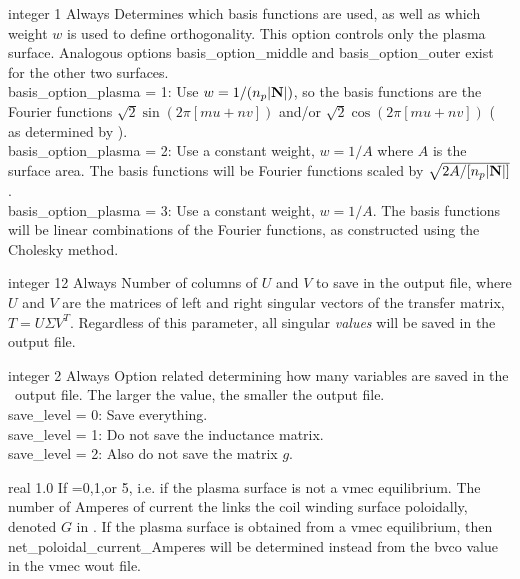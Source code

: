 {integer}
{1}
{Always}
{Determines which basis functions are used, as well as which weight $w$ is used to define orthogonality.
This option controls only the plasma surface. Analogous options {\ttfamily basis\_option\_middle} and {\ttfamily basis\_option\_outer}
exist for the other two surfaces.\\

{\ttfamily basis\_option\_plasma} = 1: Use $w = 1 / (n_p |{\mathbf N}|)$, so the basis functions
are the Fourier functions $\sqrt{2} \sin(2\pi[mu+nv])$ and/or $\sqrt{2} \cos(2\pi[mu+nv])$ (
as determined by ).\\

{\ttfamily basis\_option\_plasma} = 2: Use a constant weight, $w = 1/A$ where $A$ is the surface area. The basis functions
will be Fourier functions scaled by $\sqrt{2A/[n_p |{\mathbf N}|]}$.\\

{\ttfamily basis\_option\_plasma} = 3: Use a constant weight, $w = 1/A$. The basis functions
will be linear combinations of the Fourier functions, as constructed using the Cholesky method.
}

\myhrule

{integer}
{12}
{Always}
{Number of columns of $U$ and $V$ to save in the output file, where $U$ and $V$ are the matrices of left and right singular vectors of the transfer matrix,
$T = U\Sigma V^{T}$.
Regardless of this parameter, all singular \emph{values} will be saved in the output file.}

\myhrule

{integer}
{2}
{Always}
{Option related determining how many variables are saved in the \netCDF~output file.  The larger the value, the smaller the output file.\\

{\ttfamily save\_level} = 0: Save everything.\\

{\ttfamily save\_level} = 1: Do not save the inductance matrix.\\

{\ttfamily save\_level} = 2: Also do not save the matrix $g$.\\
}

\myhrule

{real}
{1.0}
{If =0,1,or 5, i.e. if the plasma surface is not a vmec equilibrium.}
{The number of Amperes of current the links the coil winding surface poloidally,
denoted $G$ in \cite{regcoilPaper}. If the plasma surface is obtained from a vmec equilibrium,
then {\ttfamily net\_poloidal\_current\_Amperes} will be determined instead
from the {\ttfamily bvco} value in the vmec wout file.
}

